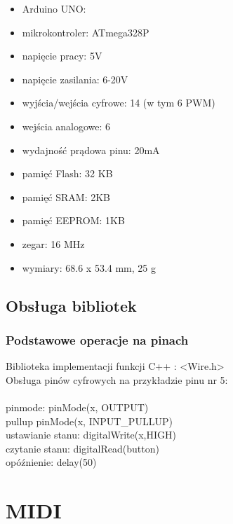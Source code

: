 \documentclass{article}
\begin{document}
\begin{itemize}
	\item Arduino UNO:
\item mikrokontroler: 		ATmega328P
\item napięcie pracy: 			5V
\item napięcie zasilania: 		6-20V
\item wyjścia/wejścia cyfrowe: 	14 (w tym 6 PWM)
\item wejścia analogowe: 		6
\item wydajność prądowa pinu: 	20mA
\item pamięć Flash: 			32 KB 
\item pamięć SRAM: 			2KB
\item pamięć EEPROM: 		1KB
\item zegar: 				16 MHz
\item wymiary: 			68.6 x 53.4 mm, 25 g
\end{itemize}

\subsection{Obsługa bibliotek}
\subsubsection{Podstawowe operacje na pinach}

Biblioteka implementacji funkcji C++ : <Wire.h>\\
Obsługa pinów cyfrowych na przykładzie pinu nr 5:\\~\\

pinmode: 			pinMode(x, OUTPUT)\\
pullup				pinMode(x, INPUT\_PULLUP)\\
ustawianie stanu: 		digitalWrite(x,HIGH)\\
czytanie stanu: 			digitalRead(button)\\
opóźnienie: 			delay(50)\\

\section{MIDI}
\end{document}
